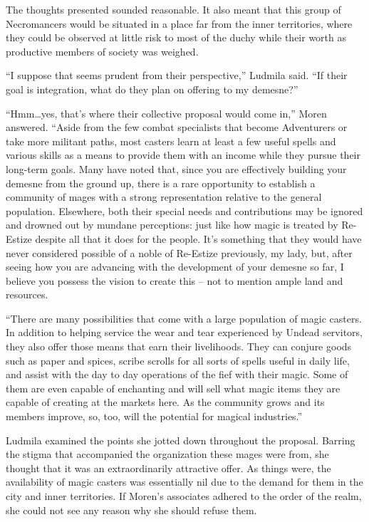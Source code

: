  

The thoughts presented sounded reasonable. It also meant that this group of Necromancers would be situated in a place far from the inner territories, where they could be observed at little risk to most of the duchy while their worth as productive members of society was weighed.

 

“I suppose that seems prudent from their perspective,” Ludmila said. “If their goal is integration, what do they plan on offering to my demesne?”

 

“Hmm…yes, that’s where their collective proposal would come in,” Moren answered. “Aside from the few combat specialists that become Adventurers or take more militant paths, most casters learn at least a few useful spells and various skills as a means to provide them with an income while they pursue their long-term goals. Many have noted that, since you are effectively building your demesne from the ground up, there is a rare opportunity to establish a community of mages with a strong representation relative to the general population. Elsewhere, both their special needs and contributions may be ignored and drowned out by mundane perceptions: just like how magic is treated by Re-Estize despite all that it does for the people. It’s something that they would have never considered possible of a noble of Re-Estize previously, my lady, but, after seeing how you are advancing with the development of your demesne so far, I believe you possess the vision to create this – not to mention ample land and resources.

 

“There are many possibilities that come with a large population of magic casters. In addition to helping service the wear and tear experienced by Undead servitors, they also offer those means that earn their livelihoods. They can conjure goods such as paper and spices, scribe scrolls for all sorts of spells useful in daily life, and assist with the day to day operations of the fief with their magic. Some of them are even capable of enchanting and will sell what magic items they are capable of creating at the markets here. As the community grows and its members improve, so, too, will the potential for magical industries.”

 

Ludmila examined the points she jotted down throughout the proposal. Barring the stigma that accompanied the organization these mages were from, she thought that it was an extraordinarily attractive offer. As things were, the availability of magic casters was essentially nil due to the demand for them in the city and inner territories. If Moren’s associates adhered to the order of the realm, she could not see any reason why she should refuse them.


